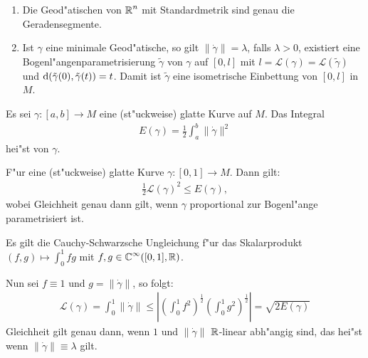 
\begin{bem}\begin{enumerate}[label=\arabic*),leftmargin=*]
\item
	Die Geod"atischen von $\operatorname{\mathbb{R}}^n$ mit Standardmetrik sind genau die Geradensegmente.
\item
	Ist $\gamma$ eine minimale Geod"atische, so gilt $\|\dot\gamma\| = \lambda$, falls $\lambda > 0$, existiert eine Bogenl"angenparametrisierung $\tilde\gamma$ von $\gamma$ auf $[0,l]$ mit $l = \mathcal L(\gamma) = \mathcal L(\tilde\gamma)$ und $\mathrm{d}(\tilde\gamma(0),\tilde\gamma(t)) = t$.
	Damit ist $\tilde\gamma$ eine isometrische Einbettung von $[0,l]$ in $M$.
\end{enumerate}\end{bem}

\begin{Dfn}
  Es sei $\gamma \colon [a,b] \to M$ eine (st"uckweise) glatte Kurve auf $M$.
  Das Integral
  \begin{align*}
    E(\gamma) = \frac{1}2 \int_a^b\|\dot\gamma\|^2
  \end{align*}
  hei"st  von $\gamma$.
\end{Dfn}

\begin{Lemma}\label{lemma-6-9}
  F"ur eine (st"uckweise) glatte Kurve $\gamma \colon [0,1] \to M$.
  Dann gilt:
  \begin{align*}
    \frac{1}2 \mathcal L(\gamma)^2 \leq E(\gamma),
  \end{align*}
  wobei Gleichheit genau dann gilt, wenn $\gamma$ proportional zur Bogenl"ange parametrisiert ist.
\end{Lemma}

\begin{bew}
  Es gilt die Cauchy-Schwarzsche Ungleichung f"ur das Skalarprodukt $(f,g) \mapsto \int_0^1 fg$ mit $f,g \in \operatorname{\mathbb{C}}^{\infty}([0,1], \operatorname{\mathbb{R}})$.

  Nun sei $f \equiv 1$ und $g = \|\dot\gamma\|$, so folgt:
  \begin{align*}
    \mathcal L(\gamma) = \int_0^1 \|\dot\gamma\| \leq \left|\left(\int_0^1 f^2\right)^{\frac{1}2} \left(\int_0^1g^2\right)^{\frac{1}2}\right| = \sqrt{2 E(\gamma)}
  \end{align*}
  Gleichheit gilt genau dann, wenn $1$ und $\|\dot\gamma\|$ $\operatorname{\mathbb{R}}$-linear abh"angig sind, das hei"st wenn $\|\dot\gamma\| \equiv \lambda$ gilt.
\end{bew}

